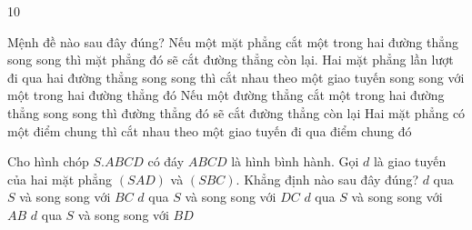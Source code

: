 \begin{indapan}{10}
\begin{ex}
{	}
\end{ex}

\begin{ex}%
	Mệnh đề nào sau đây đúng?
	\choice
	{\True Nếu một mặt phẳng cắt một trong hai đường thẳng song song thì mặt phẳng đó sẽ cắt đường thẳng còn lại.}
	{Hai mặt phẳng lần lượt đi qua hai đường thẳng song song thì cắt nhau theo một giao tuyến song song với một trong hai đường thẳng đó}
	{Nếu một đường thẳng cắt một trong hai đường thẳng song song thì đường thẳng đó sẽ cắt đường thẳng còn lại}
	{ Hai mặt phẳng có một điểm chung thì cắt nhau theo một giao tuyến đi qua điểm chung đó}
	\loigiai{
		
	}
\end{ex}

\begin{ex}%
	Cho hình chóp $S.ABCD$ có đáy $ABCD$ là hình bình hành. Gọi $d$ là giao tuyến của hai mặt phẳng $(S A D)$ và $(S B C)$. Khẳng định nào sau đây đúng?
	\choice
	{\True $d$ qua $S$ và song song với $BC$}
	{$d$ qua $S$ và song song với $DC$}
	{$d$ qua $S$ và song song với $AB$}
	{$d$ qua $S$ và song song với $BD$}
\end{ex}


\end{indapan}
